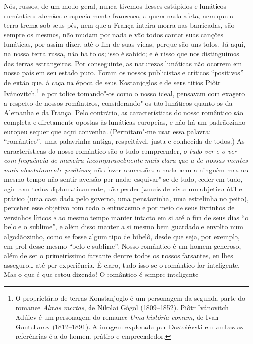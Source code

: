 Nós, russos, de um modo geral, nunca tivemos desses estúpidos e lunáticos
românticos alemães e especialmente franceses, a quem nada afeta, nem que a
terra trema sob seus pés, nem que a França inteira morra nas barricadas, são
sempre os mesmos, não mudam por nada e vão todos cantar suas canções lunáticas,
por assim dizer, até o fim de suas vidas, porque são uns tolos. Já aqui, na
nossa terra russa, não há tolos; isso é sabido; e é nisso que nos distinguimos
das terras estrangeiras. Por conseguinte, as naturezas lunáticas não ocorrem em
nosso país em seu estado puro. Foram os nossos publicistas e críticos
“positivos” de então que, à caça na época de seus Kostanjoglos e de seus titios
Piôtr Ivánovitch,\footnote{ O proprietário de terras Konstanjoglo é um
personagem da segunda parte do romance \textit{Almas mortas}, de Nikolai Gógol
(1809--1852).  Piôtr Ivánovitch Adúiev é um personagem do romance \textit{Uma
história comum}, de Ivan Gontcharov (1812--1891). A imagem explorada por
Dostoiévski em ambas as referências é a do homem prático e empreendedor.} e por
tolice tomando"-os como o nosso ideal, pensavam com exagero a respeito de nossos
românticos, considerando"-os tão lunáticos quanto os da Alemanha e da França.
Pelo contrário, as características do nosso romântico são completa e
diretamente opostas às lunáticas europeias, e não há um padrãozinho europeu
sequer que aqui convenha. (Permitam"-me usar essa palavra: “romântico”, uma
palavrinha antiga, respeitável, justa e conhecida de todos.) As características
do nosso romântico são o tudo compreender, \textit{o tudo ver e o ver com
frequência de maneira incomparavelmente mais clara que a de nossas mentes mais
absolutamente positivas}; não fazer concessões a nada nem a ninguém mas ao
mesmo tempo não sentir aversão por nada; esquivar"-se de tudo, ceder em tudo,
agir com todos diplomaticamente; não perder jamais de vista um objetivo útil e
prático (uma casa dada pelo governo, uma pensãozinha, uma estrelinha no peito),
perceber esse objetivo com todo o entusiasmo e por meio de seus livrinhos de
versinhos líricos e ao mesmo tempo manter intacto em si até o fim de seus dias
“o belo e o sublime”, e além disso manter a si mesmo bem guardado e envolto num
algodãozinho, como se fosse algum tipo de bibelô, desde que seja, por exemplo,
em prol desse mesmo “belo e sublime”. Nosso romântico é um homem generoso, além
de ser o primeiríssimo farsante dentre todos os nossos farsantes, eu lhes
asseguro\ldots{} até por experiência. É claro, tudo isso se o romântico for
inteligente. Mas o que é que estou dizendo! O romântico é sempre inteligente,
